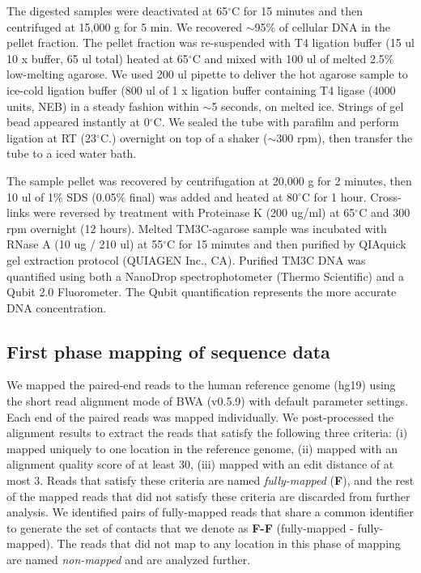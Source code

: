 The digested samples were deactivated at 65$^{\circ}\mathrm{C}$ for 15 minutes
and then centrifuged at 15,000 g for 5 min. We recovered $\sim$95\% of cellular
DNA in the pellet fraction. The pellet fraction was re-suspended with T4
ligation buffer (15 ul 10 x buffer, 65 ul total) heated at
65$^{\circ}\mathrm{C}$ and mixed with 100 ul of melted 2.5\% low-melting
agarose.  We used 200 ul pipette to deliver the hot agarose sample to ice-cold
ligation buffer (800 ul of 1 x ligation buffer containing T4 ligase (4000
units, NEB) in a steady fashion within $\sim$5 seconds, on melted ice. Strings
of gel bead appeared instantly at 0$^{\circ}\mathrm{C}$. We sealed the tube
with parafilm and perform ligation at RT (23$^{\circ}\mathrm{C}$.) overnight on
top of a shaker ($\sim$300 rpm), then transfer the tube to a iced water bath.

The sample pellet was recovered by centrifugation at 20,000 g for 2 minutes,
then 10 ul of 1\% SDS (0.05\% final) was added and heated at
80$^{\circ}\mathrm{C}$ for 1 hour. Cross-links were reversed by treatment with
Proteinase K (200 ug/ml) at 65$^{\circ}\mathrm{C}$ and 300 rpm overnight (12
hours). Melted TM3C-agarose sample was incubated with RNase A (10 ug / 210 ul)
at 55$^{\circ}\mathrm{C}$ for 15 minutes and then purified by QIAquick gel
extraction protocol (QUIAGEN Inc., CA). Purified TM3C DNA was quantified using
both a NanoDrop spectrophotometer (Thermo Scientific) and a Qubit 2.0
Fluorometer. The Qubit quantification represents the more accurate DNA
concentration.

\subsection{First phase mapping of sequence data}
We mapped the paired-end reads to the human reference genome (hg19) using the
short read alignment mode of BWA (v0.5.9) with default parameter settings. Each
end of the paired reads was mapped individually. We post-processed the
alignment results to extract the reads that satisfy the following three
criteria: (i) mapped uniquely to one location in the reference genome, (ii)
mapped with an alignment quality score of at least 30, (iii) mapped with an
edit distance of at most 3. Reads that satisfy these criteria are named
\emph{fully-mapped} (\textbf{F}), and the rest of the mapped reads that did not
satisfy these criteria are discarded from further analysis. We identified pairs
of fully-mapped reads that share a common identifier to generate the set of
contacts that we denote as \textbf{F-F} (fully-mapped - fully-mapped). The
reads that did not map to any location in this phase of mapping are named
\emph{non-mapped} and are analyzed further.


